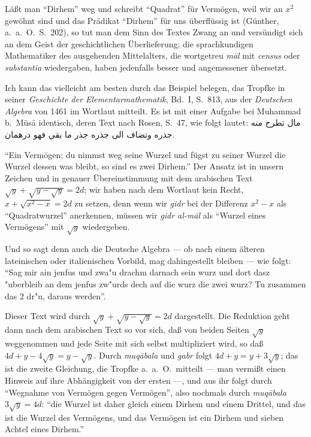 \documentclass[11pt,a4paper]{article}
\newcommand{\RL}[1]{\beginR#1\endR}
\newcommand{\ar}[1]{{\arabicfont\RL{#1}}}
\newcommand{\enquote}[1]{``#1''}
\begin{document}
L\"a\ss{}t man \enquote{Dirhem} weg und schreibt \enquote{Quadrat} f\"ur Verm\"ogen, weil wir an $x^{2}$ gew\"ohnt sind und das Pr\"adikat \enquote{Dirhem} f\"ur uns \"uberfl\"ussig ist (G\"unther, a.\ a.\ O.\ S.\ 202), so tut man dem Sinn des Textes Zwang an und vers\"undigt sich an dem Geist der geschichtlichen \"Uberlieferung; die sprachkundigen Mathematiker des ausgehenden Mittelalters, die wortgetreu \textit{m\=al} mit \textit{census} oder \textit{substantia} wiedergaben, haben jedenfalls besser und angemessener \"ubersetzt.

Ich kann das vielleicht am besten durch das Beispiel belegen, das Tropfke in seiner \textit{Geschichte der Elementarmathematik}, Bd.\ I, S.\ 813, aus der \textit{Deutschen Algebra} von 1461 im Wortlaut mitteilt. Es ist mit einer Aufgabe bei Muhammad b.\ M\"us\=a identisch, deren Text nach Rosen, S.\ 47, wie folgt lautet: \ar{مال تطرح منه جذره وتضاف الى جذره جذر ما بقي فهو درهمان}.

\enquote{Ein Verm\"ogen; du nimmst weg seine Wurzel und f\"ugst zu seiner Wurzel die Wurzel dessen was bleibt, so sind es zwei Dirhem.} Der Ansatz ist in unsern Zeichen und in genauer \"Ubereinstimmung mit dem arabischen Text $\sqrt{y} + \sqrt{y - \sqrt{y}} = 2d$; wir haben nach dem Wortlaut kein Recht, $x + \sqrt{x^{2} - x} = 2d$ zu setzen, denn wenn wir \textit{gidr} bei der Differenz $x^{2} - x$ als \enquote{Quadratwurzel} anerkennen, m\"ussen wir \textit{gidr al-m\=al} als \enquote{Wurzel eines Verm\"ogens} mit $\sqrt{y}$ wiedergeben.

Und so sagt denn auch die Deutsche Algebra --- ob nach einem \"alteren lateinischen oder italienischen Vorbild, mag dahingestellt bleiben --- wie folgt: \enquote{Sag mir ain jenfus und zwa"{u} drachm darnach sein wurz und dort dasz "{u}berbleib an dem jenfus zw"{u}rds dech auf die wurz die zwei wurz? Tu zusammen das 2 dr"{u}, daraus werden}.

Dieser Text wird durch $\sqrt{y} + \sqrt{y - \sqrt{y}} = 2d$ dargestellt. Die Reduktion geht dann nach dem arabischen Text so vor sich, da\ss{} von beiden Seiten $\sqrt{y}$ weggenommen und jede Seite mit sich selbst multipliziert wird, so da\ss{} $4d + y - 4\sqrt{y} = y - \sqrt{y}$. Durch \textit{muq\=abala} und \textit{gabr} folgt $4d + y = y + 3\sqrt{y}$; das ist die zweite Gleichung, die Tropfke a.\ a.\ O.\ mitteilt --- man vermi\ss{}t einen Hinweis auf ihre Abh\"angigkeit von der ersten ---, und aus ihr folgt durch \enquote{Wegnahme von Verm\"ogen gegen Verm\"ogen}, also nochmals durch \textit{muq\=abala} $3\sqrt{y} = 4d$: \enquote{die Wurzel ist daher gleich einem Dirhem und einem Drittel, und das ist die Wurzel des Verm\"ogens, und das Verm\"ogen ist ein Dirhem und sieben Achtel eines Dirhem.}
\end{document}
